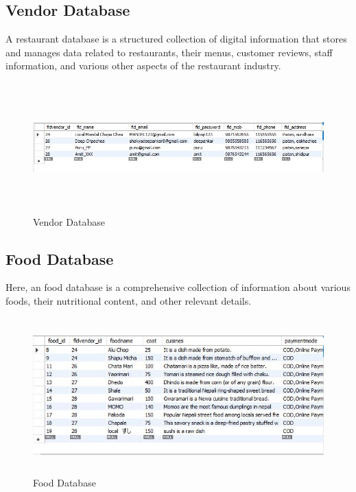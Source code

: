 \newpage
\subsection{Vendor Database}
A restaurant database is a structured collection of digital information that stores and manages data related to restaurants, their menus, customer reviews, staff information, and various other aspects of the restaurant industry. 
\begin{figure}[h]
    \centering
    \includegraphics[width=15cm, height=5cm]{img/Graphics/vendorDB.JPG}
    \caption{Vendor Database}
\end{figure}

\subsection{Food Database}
Here, an food database is a comprehensive collection of information about various foods, their nutritional content, and other relevant details.
\begin{figure}[h]
    \centering
    \includegraphics[height=6cm]{img/Graphics/foodDB.JPG}
    \caption{Food Database}
\end{figure}

\newpage
